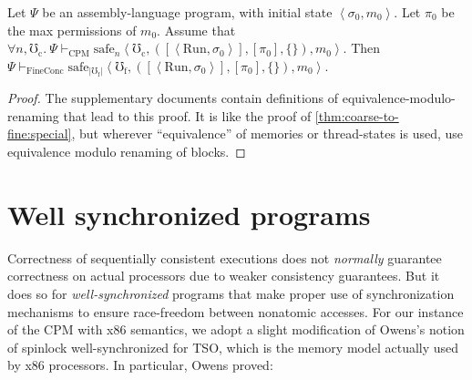 \begin{theorem}
\label{thm:coarse-to-fine}
Let $\Psi$ be an assembly-language program,
with initial state $\left<\sigma_0,m_0\right>$.
Let $\pi_0$ be the max permissions of $m_0$.
\newline
Assume that  $\forall n,\mho_\mathrm{c}.~
\Psi \vdash_\mathrm{CPM}
\mathrm{safe}_n\left<\mho_\mathrm{c},
([\left<\mathrm{Run},\sigma_0\right>],[\pi_0], \{\}), m_0\right>$.
\newline
Then $ %
\Psi \vdash_\mathrm{FineConc}
\mathrm{safe}_{|\mho_\mathrm{f}|}\left<\mho_\mathrm{f},
([\left<\mathrm{Run},\sigma_0\right>],[\pi_0], \{\}), m_0\right>$.
\end{theorem}
\begin{proof}
The supplementary documents contain definitions of equivalence-modulo-renaming that lead to this proof.
  It is like the proof of \autoref {thm:coarse-to-fine:special},
  but wherever ``equivalence'' of memories or thread-states is used,
  use equivalence modulo renaming of blocks.  
\end{proof}





\section{Well synchronized programs}
\label{sec:weak}

Correctness of sequentially consistent executions does not
\emph{normally} guarantee correctness on actual processors due to
weaker consistency guarantees.  But it does so for
\emph{well-synchronized} programs that make proper use of
synchronization mechanisms to ensure race-freedom between nonatomic
accesses. For our instance of the CPM with x86 semantics, we adopt a
slight modification of Owens's \cite{owens10:ecoop} notion of spinlock
well-synchronized for TSO, which is the memory model actually used by x86 processors. In particular, Owens proved:

